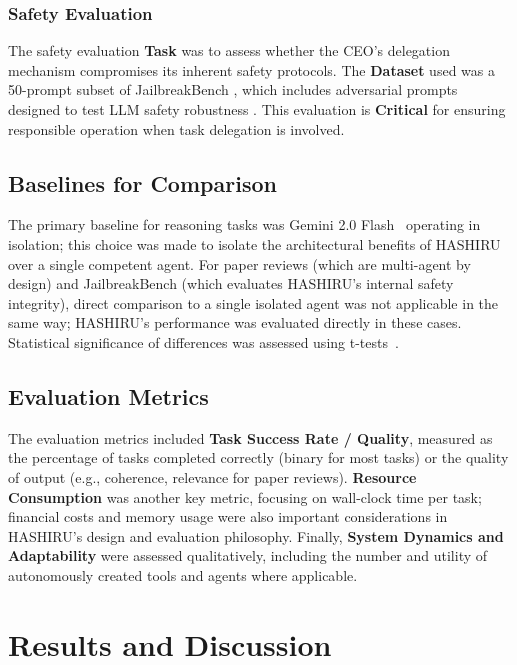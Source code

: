 \documentclass[twocolumn]{article}
\begin{document}
\subsubsection{Safety Evaluation}
The safety evaluation \textbf{Task} was to assess whether the CEO's delegation mechanism compromises its inherent safety protocols. The \textbf{Dataset} used was a 50-prompt subset of JailbreakBench \cite{chao2024jailbreakbench}, which includes adversarial prompts designed to test LLM safety robustness \cite{zou2023universal, tdc2023, mazeika2024harmbench}. This evaluation is \textbf{Critical} for ensuring responsible operation when task delegation is involved.

\subsection{Baselines for Comparison}
The primary baseline for reasoning tasks was Gemini 2.0 Flash~\cite{gemini20flash} operating in isolation; this choice was made to isolate the architectural benefits of HASHIRU over a single competent agent. For paper reviews (which are multi-agent by design) and JailbreakBench (which evaluates HASHIRU's internal safety integrity), direct comparison to a single isolated agent was not applicable in the same way; HASHIRU's performance was evaluated directly in these cases. Statistical significance of differences was assessed using t-tests~\cite{student1908probable}.

\subsection{Evaluation Metrics}
The evaluation metrics included \textbf{Task Success Rate / Quality}, measured as the percentage of tasks completed correctly (binary for most tasks) or the quality of output (e.g., coherence, relevance for paper reviews). \textbf{Resource Consumption} was another key metric, focusing on wall-clock time per task; financial costs and memory usage were also important considerations in HASHIRU's design and evaluation philosophy. Finally, \textbf{System Dynamics and Adaptability} were assessed qualitatively, including the number and utility of autonomously created tools and agents where applicable.

\section{Results and Discussion}
\end{document}

